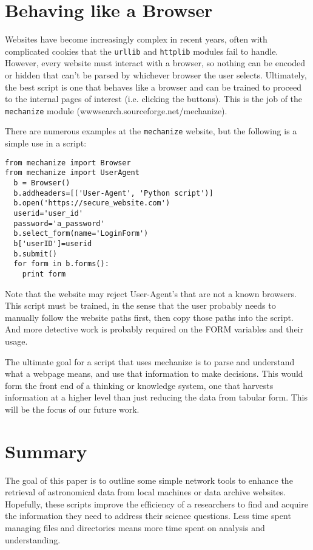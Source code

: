 \documentclass[11pt,preprint,graphicx]{aastex}
\begin{document}
\section{Behaving like a Browser}

\noindent Websites have become increasingly complex in recent years, often with
complicated cookies that the {\tt urllib} and {\tt httplib} modules fail to
handle.  However, every website must interact with a browser, so nothing
can be encoded or hidden that can't be parsed by whichever browser the user
selects.  Ultimately, the best script is one that behaves like a browser
and can be trained to proceed to the internal pages of interest (i.e.
clicking the buttons).  This is the job of the {\tt mechanize} module
(wwwsearch.sourceforge.net/mechanize).

\noindent There are numerous examples at the {\tt mechanize} website, but the
following is a simple use in a script:

\begin{verbatim}
from mechanize import Browser
from mechanize import UserAgent
  b = Browser()
  b.addheaders=[('User-Agent', 'Python script')]
  b.open('https://secure_website.com')
  userid='user_id'
  password='a_password'
  b.select_form(name='LoginForm')
  b['userID']=userid
  b.submit()
  for form in b.forms():
    print form
\end{verbatim}

\noindent Note that the website may reject User-Agent's that are not a known
browsers.  This script must be trained, in the sense that the user probably
needs to manually follow the website paths first, then copy those paths
into the script.  And more detective work is probably required on the FORM
variables and their usage.

\noindent The ultimate goal for a script that uses mechanize is to
parse and understand what a webpage means, and use that information to make
decisions.  This would form the front end of a thinking or knowledge
system, one that harvests information at a higher level than just reducing
the data from tabular form.  This will be the focus of our future work.

\section{Summary}

\noindent The goal of this paper is to outline some simple network tools to
enhance the retrieval of astronomical data from local machines or data
archive websites.  Hopefully, these scripts improve the efficiency of a
researchers to find and acquire the information they need to address their
science questions.  Less time spent managing files and directories means
more time spent on analysis and understanding.
\end{document}
